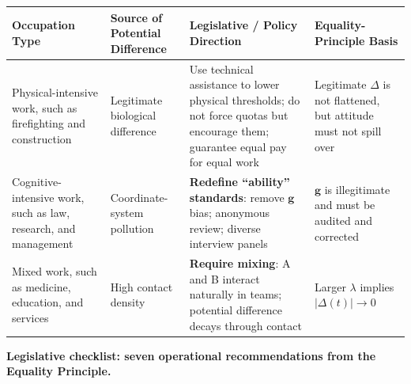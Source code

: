 \documentclass[12pt,a4paper]{article}
\theoremstyle{remark}
\begin{document}
\begin{center}
\begin{tabular}{p{2.5cm} p{3cm} p{4.5cm} p{4.5cm}}
\toprule
\textbf{Occupation Type} & \textbf{Source of Potential Difference} & \textbf{Legislative / Policy Direction} & \textbf{Equality-Principle Basis} \\
\midrule
Physical-intensive work, such as firefighting and construction & Legitimate biological difference & Use technical assistance to lower physical thresholds; do not force quotas but encourage them; guarantee equal pay for equal work & Legitimate $\Delta$ is not flattened, but attitude must not spill over \\
\hline
Cognitive-intensive work, such as law, research, and management & Coordinate-system pollution & \textbf{Redefine ``ability'' standards}: remove $\mathbf{g}$ bias; anonymous review; diverse interview panels & $\mathbf{g}$ is illegitimate and must be audited and corrected \\
\hline
Mixed work, such as medicine, education, and services & High contact density & \textbf{Require mixing}: A and B interact naturally in teams; potential difference decays through contact & Larger $\lambda$ implies $|\Delta(t)| \to 0$ \\
\bottomrule
\end{tabular}
\end{center}

\textbf{Legislative checklist: seven operational recommendations from the Equality Principle.}
\end{document}

